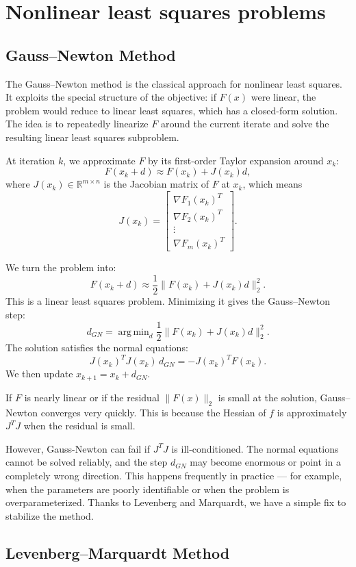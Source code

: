 \documentclass[lang=en,color=blue,mode=fancy,titlestyle=hang]{elegantbook}
\DeclareMathOperator*{\argmin}{arg\,min}
\begin{document}
\section{Nonlinear least squares problems}
\subsection{Gauss–Newton Method}

The Gauss–Newton method is the classical approach for nonlinear least squares. It exploits
the special structure of the objective: if $F(x)$ were linear, the problem would reduce to linear
least squares, which has a closed-form solution. The idea is to repeatedly linearize $F$ around
the current iterate and solve the resulting linear least squares subproblem.

At iteration $k$, we approximate $F$ by its first-order Taylor expansion around $x_k$:
\[
F(x_k + d) \approx F(x_k) + J(x_k) d,
\]
where $J(x_k) \in \mathbb{R}^{m \times n}$ is the Jacobian matrix of $F$ at $x_k$, which means
\[
J(x_k) = \begin{bmatrix}
  \nabla F_1(x_k)^T \\
  \nabla F_2(x_k)^T \\
  \vdots \\
  \nabla F_m(x_k)^T
\end{bmatrix}.
\]

We turn the problem into:
\[
F(x_k + d) \approx \frac12 \|F(x_k) + J(x_k) d\|_2^2.
\]
This is a linear least squares problem. Minimizing it gives the Gauss–Newton step:
\[
d_{GN} = \argmin_{d} \frac12 \|F(x_k) + J(x_k) d\|_2^2.
\]
The solution satisfies the normal equations:
\[
J(x_k)^T J(x_k) \, d_{GN} = -J(x_k)^T F(x_k).
\]
We then update $x_{k+1} = x_k + d_{GN}$.

If $F$ is nearly linear or if the residual $\|F(x)\|_2$ is small at the solution, Gauss–Newton
converges very quickly. This is because the Hessian of $f$ is approximately $J^T J$ when the
residual is small.

However, Gauss-Newton can fail if $J^T J$ is ill-conditioned. The normal equations cannot be
solved reliably, and the step $d_{GN}$ may become enormous or point in a completely wrong direction.
This happens frequently in practice — for example, when the parameters are poorly identifiable
or when the problem is overparameterized. Thanks to Levenberg and Marquardt, we have a simple fix
to stabilize the method.

\subsection{Levenberg–Marquardt Method}
\end{document}
